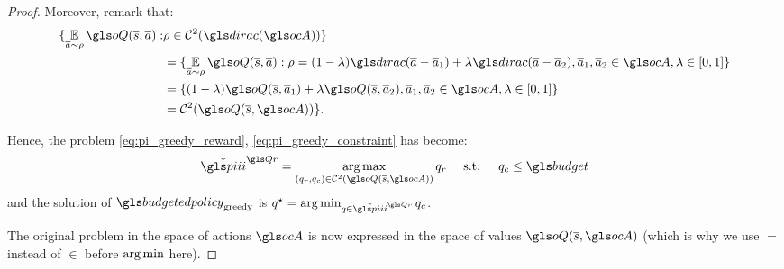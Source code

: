 \begin{subappendices}
\begin{proof}
    Moreover, remark that:
    \begin{align*}
        \{\expectedvalueover{\oa\sim\rho} \oQ(\os,\oa):& \rho\in \cC^2(\dirac(\ocA))\} \\
        &= \{\expectedvalueover{\oa\sim\rho} \oQ(\os,\oa): \rho=(1-\lambda)\dirac(\oa-\oa_1)+\lambda\dirac(\oa-\oa_2), \oa_1,\oa_2\in\ocA, \lambda\in[0,1]\} \\
        &= \{(1-\lambda)\oQ(\os, \oa_1)+\lambda \oQ(\os, \oa_2), \oa_1,\oa_2\in\ocA, \lambda\in[0,1]\} \\
        &= \cC^2(\oQ(\os,\ocA))\}.
    \end{align*}

    Hence, the problem \eqref{eq:pi_greedy_reward}, \eqref{eq:pi_greedy_constraint} has become:
    \begin{equation*}
        \tilde{\policies}^{\Qr} = \argmax_{(q_r, q_c)\in\cC^2(\oQ(\os, \ocA))} q_r \quad\text{ s.t. }\quad q_c \leq \budget
    \end{equation*}
    and the solution of $\budgetedpolicy_\text{greedy}$ is $q^{\star}=\argmin_{q\in\tilde{\policies}^{\Qr}} q_c$.

    The original problem in the space of actions $\ocA$ is now expressed in the space of values $\oQ(\os, \ocA)$ (which is why we use $=$ instead of $\in$ before $\operatorname*{arg\,min}$ here).


\end{proof}
\end{subappendices}
